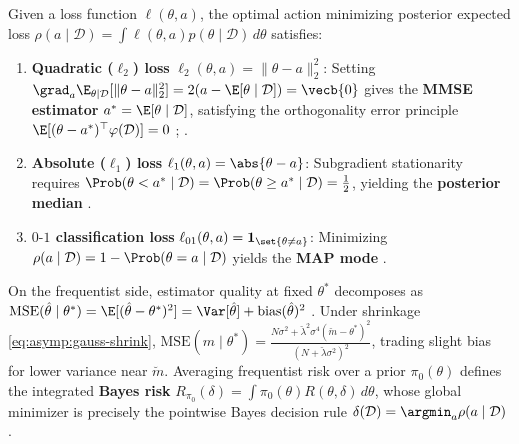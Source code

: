 \documentclass[../../../../master.tex]{subfiles}
\begin{document}
\begin{coremath}
Given a loss function $\ell(\theta, a)$, the optimal action minimizing posterior expected loss $\rho(a \mid \mathcal{D}) = \int \ell(\theta, a) p(\theta \mid \mathcal{D})\,d\theta$ satisfies:
\begin{enumerate}
  \item \textbf{Quadratic ($\ell_2$) loss} $\ell_2(\theta, a) = \|\theta - a\|_2^2$: Setting $\grad_a \E_{\theta\mid\mathcal{D}}[\|\theta - a\|_2^2] = 2(a - \E[\theta \mid \mathcal{D}]) = \vecb{0}$ gives the \textbf{MMSE estimator} $a^* = \E[\theta \mid \mathcal{D}]$, satisfying the orthogonality error principle $\E[(\theta - a^*)^\top \varphi(\mathcal{D})] = 0$ ; .
  \item \textbf{Absolute ($\ell_1$) loss} $\ell_1(\theta, a) = \abs{\theta - a}$: Subgradient stationarity requires $\Prob(\theta < a^* \mid \mathcal{D}) = \Prob(\theta \ge a^* \mid \mathcal{D}) = \frac{1}{2}$, yielding the \textbf{posterior median} .
  \item \textbf{$0\text{-}1$ classification loss} $\ell_{01}(\theta, a) = \mathbf{1}_{\set{\theta \ne a}}$: Minimizing $\rho(a\mid\mathcal{D}) = 1 - \Prob(\theta = a \mid \mathcal{D})$ yields the \textbf{MAP mode} .
\end{enumerate}
On the frequentist side, estimator quality at fixed $\theta^*$ decomposes as $\mathrm{MSE}(\hat{\theta} \mid \theta^*) = \E[(\hat{\theta} - \theta^*)^2] = \Var[\hat{\theta}] + \mathrm{bias}(\hat{\theta})^2$ . Under shrinkage \eqref{eq:asymp:gauss-shrink}, $\mathrm{MSE}(\hat{m} \mid \theta^*) = \frac{N\sigma^2 + \breve{\lambda}^2 \sigma^4(\breve{m} - \theta^*)^2}{(N + \breve{\lambda}\sigma^2)^2}$, trading slight bias for lower variance near $\breve{m}$. Averaging frequentist risk over a prior $\pi_0(\theta)$ defines the integrated \textbf{Bayes risk} $R_{\pi_0}(\delta) = \int \pi_0(\theta) R(\theta, \delta)\,d\theta$, whose global minimizer is precisely the pointwise Bayes decision rule $\delta(\mathcal{D}) = \argmin_a \rho(a \mid \mathcal{D})$ .
\end{coremath}
\end{document}
